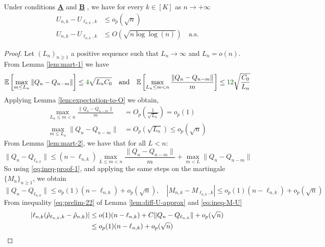 \begin{lemma}\label{lem:U-ineq}
	Under conditions \hyperlink{CA}{\textbf{A}} and \hyperlink{CB}{\textbf{B}} , we have for every \(k \in [K]\) as \(n \to +\infty\)	
	\begin{align}
		U_{n,k} - U_{\ell_{n,k},k} &\leq o_p(\sqrt{n})\label{eq:ineq-U-1}\\
		U_{n,k} - U_{\ell_{n,k},k} &\leq O(\sqrt{n \log \log(n)}) \quad \text{a.s.}\label{eq:ineq-U-2}
	\end{align}
\end{lemma}	
\begin{proof}
	Let \((L_n)_{n \geq 1}\) a positive sequence such that $L_n \to \infty$ and $L_n = o(n)$. From Lemma \ref{lem:mart-1} we have
	\begin{equation*}
		\mathbb{E}\left[\max_{m \leq L_n} \|Q_n - Q_{n-m}\| \right] \leq {\color{revisiongreen}4}\sqrt{L_n C_0}
		\quad \text{and} \quad \mathbb{E}\left[\max_{L_n \leq m < n} \frac{\|Q_n - Q_{n-m}\|}{m} \right] \leq {\color{revisiongreen}12}\sqrt{\frac{C_0}{L_n}}  
	\end{equation*}
	Applying Lemma \ref{lem:expectation-to-O} we obtain,
	\begin{align*}
		\max_{L_n \leq m < n} \frac{\|Q_n - Q_{n-m}\|}{m} &= O_p\left(\frac{1}{\sqrt{L_n}}\right) = o_p(1)\\ 
		\max_{m \leq L_n} \|Q_n - Q_{n-m}\| &= O_p(\sqrt{L_n}) \leq o_p(\sqrt{n})
	\end{align*}
	From Lemma \ref{lem:mart-2}, we have that for all \(L < n\):
	\begin{equation}\label{eq:ineq-proof-1}
		\|Q_n - Q_{\ell_{n,k}}\| \leq (n - \ell_{n,k}) \max_{L \leq m < n} \frac{\|Q_n - Q_{n-m}\|}{m} + \max_{m < L} \|Q_n - Q_{n-m}\|
	\end{equation}
	So using \eqref{eq:ineq-proof-1}, and applying the same steps on the martingale \(\{M_n\}_{n \geq 1}\), we obtain
	\begin{equation}\label{eq:ineq-M-U}
		\|Q_n - Q_{\ell_{n,k}}\| \leq o_p(1)(n - \ell_{n,k}) + o_p(\sqrt{n}), \quad |M_{n,k} - M_{\ell_{n,k},k}| \leq o_p(1)(n - \ell_{n,k}) + o_p(\sqrt{n})
	\end{equation}	
	From inequality \eqref{eq:prelim-22} of Lemma \ref{lem:diff-U-approx} and \eqref{eq:ineq-M-U}
	\begin{align}
		|\ell_{n,k} (\hat{\rho}_{\ell_{n,k},k} - \hat{\rho}_{n,k})| &\leq o(1)(n - \ell_{n,k}) + C \|Q_n - Q_{\ell_{n,k}}\| + o_p(\sqrt{n})\notag\\
		&\leq o_p(1)(n - \ell_{n,k}) + o_p(\sqrt{n})\label{eq:ineq_ell}

\end{align}
\end{proof}
